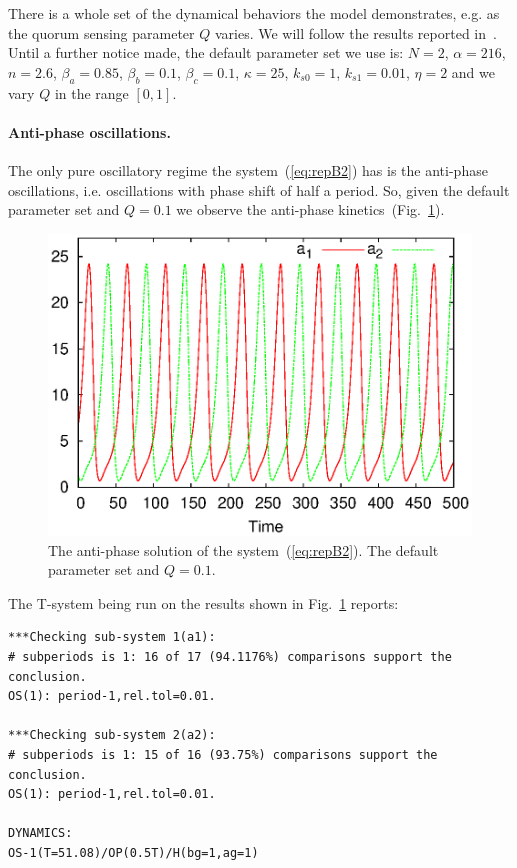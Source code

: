 \documentclass[11pt,a4paper]{article}
\begin{document}
There is a whole set of the dynamical behaviors the model demonstrates, e.g. as the
quorum sensing parameter $Q$ varies. We will follow the results reported
in~\cite{Ullner2008}. Until a further notice made, the default parameter set we use
is: $N=2$, $\alpha=216$, $n=2.6$, $\beta_a=0.85$, $\beta_b=0.1$, $\beta_c=0.1$,
$\kappa=25$, $k_{s0}=1$, $k_{s1}=0.01$, $\eta=2$ and we vary $Q$ in the range $[0, 1]$.

\paragraph{Anti-phase oscillations.}
\label{sec:anti-phase-oscill}

The only pure oscillatory regime the system~(\ref{eq:repB2}) has is the anti-phase
oscillations, i.e. oscillations with phase shift of half a period. So, given the
default parameter set and $Q=0.1$ we observe the anti-phase
kinetics~(Fig.~\ref{fig:rB2_op}).

\begin{figure}[h]
  \centering
  \includegraphics[scale=0.65]{rB2_op}
  \caption{The anti-phase solution of the system~(\ref{eq:repB2}). The default
    parameter set and $Q=0.1$.}
  \label{fig:rB2_op}
\end{figure}

The T-system being run on the results shown in Fig.~\ref{fig:rB2_op} reports:
\begin{verbatim}
***Checking sub-system 1(a1):
# subperiods is 1: 16 of 17 (94.1176%) comparisons support the conclusion.
OS(1): period-1,rel.tol=0.01.

***Checking sub-system 2(a2):
# subperiods is 1: 15 of 16 (93.75%) comparisons support the conclusion.
OS(1): period-1,rel.tol=0.01.

DYNAMICS:
OS-1(T=51.08)/OP(0.5T)/H(bg=1,ag=1)
\end{verbatim}
\end{document}
